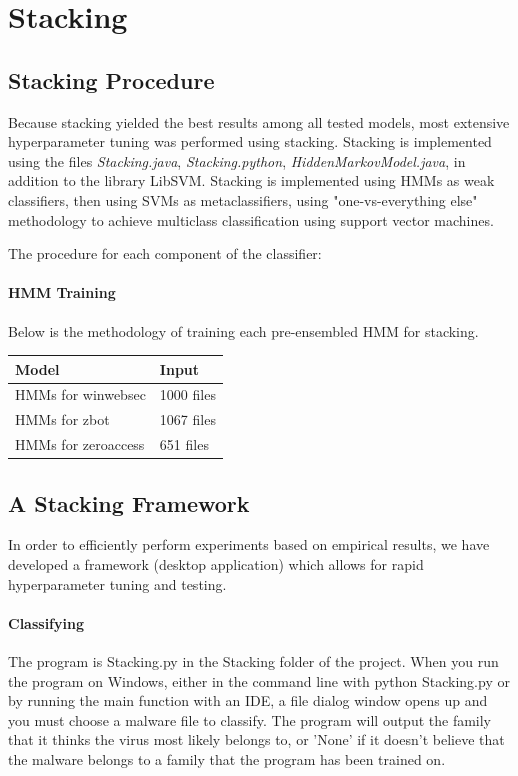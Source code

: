 \documentclass[12pt]{article}
\begin{document}
\section{Stacking}
  \subsection{Stacking Procedure}
  Because stacking yielded the best results among all tested models, most extensive hyperparameter tuning was performed using stacking. Stacking is implemented using the files \textit{Stacking.java}, \textit{Stacking.python}, \textit{HiddenMarkovModel.java}, in addition to the library LibSVM. Stacking is implemented using HMMs as weak classifiers, then using SVMs as metaclassifiers, using "one-vs-everything else"  methodology to achieve multiclass classification using support vector machines.

The procedure for each component of the classifier:
\paragraph{HMM Training}
Below is the methodology of training each pre-ensembled HMM for stacking.
\begin{table}[H]
    \centering
    \begin{tabular}{|l|p{}|}
    \hline \textbf{Model} & \textbf{Input} \\\hline \hline
    HMMs for winwebsec   & 
          1000 files 
          \\\hline
    HMMs for zbot   & 
     1067 files 
    \\\hline
     HMMs for zeroaccess
     & 
    651 files
  \\\hline
  \end{tabular}
  \end{table}  

  \subsection{A Stacking Framework}
  In order to efficiently perform experiments based on empirical results, we have developed a framework (desktop application) which allows for rapid hyperparameter tuning and testing. 

  \paragraph{Classifying}
  The program is Stacking.py in the Stacking folder of the project. When you run the program on Windows, either in the command line with python Stacking.py or by running the main function with an IDE, a file dialog window opens up and you must choose a malware file to classify. The program will output the family that it thinks the virus most likely belongs to, or 'None' if it doesn't believe that the malware belongs to a family that the program has been trained on. 
\end{document}
